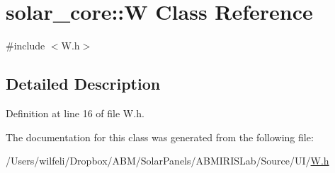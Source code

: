 \hypertarget{classsolar__core_1_1_w}{}\section{solar\+\_\+core\+:\+:W Class Reference}
\label{classsolar__core_1_1_w}


{\ttfamily \#include $<$W.\+h$>$}



\subsection{Detailed Description}


Definition at line 16 of file W.\+h.



The documentation for this class was generated from the following file\+:\begin{DoxyCompactItemize}
\item 
/\+Users/wilfeli/\+Dropbox/\+A\+B\+M/\+Solar\+Panels/\+A\+B\+M\+I\+R\+I\+S\+Lab/\+Source/\+U\+I/\hyperlink{_w_8h}{W.\+h}\end{DoxyCompactItemize}
